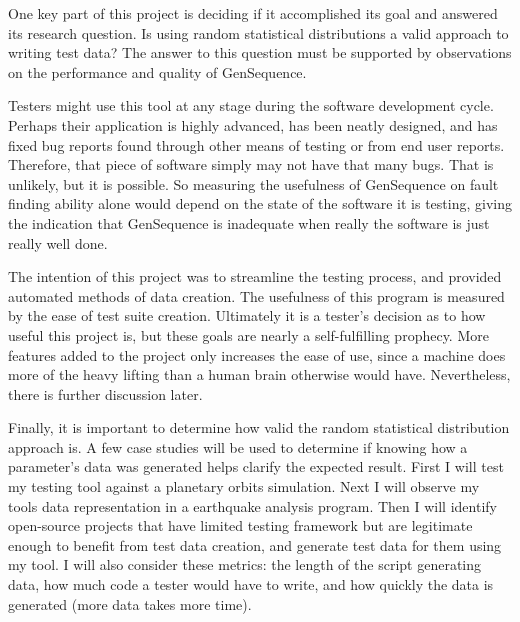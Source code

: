 
One key part of this project is deciding if it accomplished its goal and answered its research question. Is using random statistical distributions a valid approach to writing test data? The answer to this question must be supported by observations on the performance and quality of GenSequence. 

Testers might use this tool at any stage during the software development cycle. Perhaps their application is highly advanced, has been neatly designed, and has fixed bug reports found through other means of testing or from end user reports. Therefore, that piece of software simply may not have that many bugs. That is unlikely, but it is possible. So measuring the usefulness of GenSequence on fault finding ability alone would depend on the state of the software it is testing, giving the indication that GenSequence is inadequate when really the software is just really well done.

The intention of this project was to streamline the testing process, and provided automated methods of data creation. The usefulness of this program is measured by the ease of test suite creation. Ultimately it is a tester’s decision as to how useful this project is, but these goals are nearly a self-fulfilling prophecy. More features added to the project only increases the ease of use, since a machine does more of the heavy lifting than a human brain otherwise would have. Nevertheless, there is further discussion later.

Finally, it is important to determine how valid the random statistical distribution approach is. A few case studies will be used to determine if knowing how a parameter’s data was generated helps clarify the expected result. First I will test my testing tool against a planetary orbits simulation. Next I will observe my tools data representation in a earthquake analysis program. Then I will identify open-source projects that have limited testing framework but are legitimate enough to benefit from test data creation, and generate test data for them using my tool. I will also consider these metrics: the length of the script generating data, how much code a tester would have to write, and how quickly the data is generated (more data takes more time).
